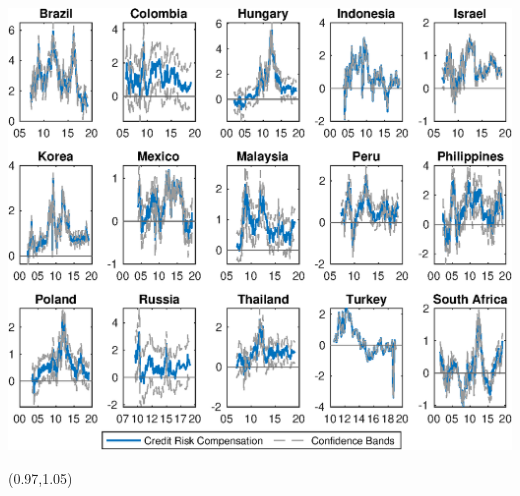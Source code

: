 \documentclass[12pt, aspectratio=169, xcolor=dvipsnames]{beamer}
\begin{document}
\begin{frame}[label=crcCI]
\begin{center}							%
\includegraphics[trim={0cm 0cm 0cm 0cm},clip,height=0.95\textheight,width=\linewidth]{../Figures/Estimation/bsl_cr_CI_10y_V1.eps} \\
\end{center}
\begin{textblock*}{5cm}(0.97\textwidth,1.05\textheight)
\hyperlink{YldDcmp}{}
\end{textblock*}
\end{frame}

\end{document}
